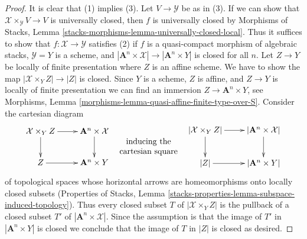 \begin{proof}
\medskip\noindent
It is clear that (1) implies (3). Let $V \to \mathcal{Y}$ be as in (3).
If we can show that $\mathcal{X} \times_{\mathcal{Y}} V \to V$ is universally closed,
then $f$ is universally closed by
Morphisms of Stacks, Lemma
\ref{stacks-morphisms-lemma-universally-closed-local}.
Thus it suffices to show that $f : \mathcal{X} \to \mathcal{Y}$ satisfies (2)
if $f$ is a quasi-compact morphism of algebraic stacks,
$\mathcal{Y} = Y$ is a scheme, and
$|\mathbf{A}^n \times \mathcal{X}| \to |\mathbf{A}^n \times Y|$
is closed for all $n$. Let $Z \to Y$ be locally of finite presentation
where $Z$ is an affine scheme.
We have to show the map $|\mathcal{X} \times_Y Z| \to |Z|$ is closed.
Since $Y$ is a scheme, $Z$ is affine, and $Z \to Y$ is
locally of finite presentation we can find an immersion
$Z \to \mathbf{A}^n \times Y$, see
Morphisms, Lemma \ref{morphisms-lemma-quasi-affine-finite-type-over-S}.
Consider the cartesian diagram
$$
\vcenter{
\xymatrix{
\mathcal{X} \times_Y Z \ar[d] \ar[r] &
\mathbf{A}^n \times \mathcal{X} \ar[d] \\
Z \ar[r] & \mathbf{A}^n \times Y
}
}
\quad
\begin{matrix}
\text{inducing the} \\
\text{cartesian square}
\end{matrix}
\quad
\vcenter{
\xymatrix{
|\mathcal{X} \times_Y Z| \ar[d] \ar[r] &
|\mathbf{A}^n \times \mathcal{X}| \ar[d] \\
|Z| \ar[r] & |\mathbf{A}^n \times Y|
}
}
$$
of topological spaces whose horizontal arrows are homeomorphisms
onto locally closed subsets (Properties of Stacks, Lemma
\ref{stacks-properties-lemma-subspace-induced-topology}).
Thus every closed subset $T$
of $|\mathcal{X} \times_Y Z|$ is the pullback of a closed subset $T'$ of
$|\mathbf{A}^n \times \mathcal{X}|$. Since the assumption is that the image
of $T'$ in $|\mathbf{A}^n \times Y|$ is closed we conclude that
the image of $T$ in $|Z|$ is closed as desired.
\end{proof}















